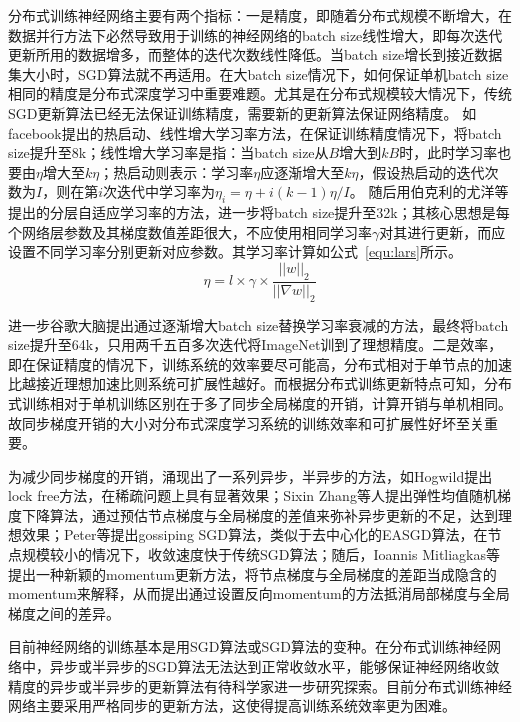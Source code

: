 分布式训练神经网络主要有两个指标：一是精度，即随着分布式规模不断增大，在数据并行方法下必然导致用于训练的神经网络的batch size线性增大，即每次迭代更新所用的数据增多，而整体的迭代次数线性降低。当batch size增长到接近数据集大小时，SGD算法就不再适用。在大batch size情况下，如何保证单机batch size相同的精度是分布式深度学习中重要难题。尤其是在分布式规模较大情况下，传统SGD更新算法已经无法保证训练精度，需要新的更新算法保证网络精度。
如facebook提出的热启动、线性增大学习率方法，在保证训练精度情况下，将batch size提升至8k；线性增大学习率是指：当batch size从$B$增大到$kB$时，此时学习率也要由$\eta$增大至$k\eta$；热启动则表示：学习率$\eta$应逐渐增大至$k\eta$，假设热启动的迭代次数为$I$，则在第$i$次迭代中学习率为$\eta _{i}=\eta + i(k-1)\eta/I$。
随后用伯克利的尤洋等提出的分层自适应学习率的方法，进一步将batch size提升至32k；其核心思想是每个网络层参数及其梯度数值差距很大，不应使用相同学习率$\gamma$对其进行更新，而应设置不同学习率分别更新对应参数。其学习率计算如公式~\ref{equ:lars}所示。
\begin{equation}
\eta = l \times \gamma \times \frac{||w||_{2}}{||\nabla w||_{2}}
\label{equ:lars}
\end{equation}

进一步谷歌大脑提出通过逐渐增大batch size替换学习率衰减的方法，最终将batch size提升至64k，只用两千五百多次迭代将ImageNet训到了理想精度。二是效率，即在保证精度的情况下，训练系统的效率要尽可能高，分布式相对于单节点的加速比越接近理想加速比则系统可扩展性越好。而根据分布式训练更新特点可知，分布式训练相对于单机训练区别在于多了同步全局梯度的开销，计算开销与单机相同。故同步梯度开销的大小对分布式深度学习系统的训练效率和可扩展性好坏至关重要。

为减少同步梯度的开销，涌现出了一系列异步，半异步的方法，如Hogwild提出lock free方法，在稀疏问题上具有显著效果；Sixin Zhang等人提出弹性均值随机梯度下降算法，通过预估节点梯度与全局梯度的差值来弥补异步更新的不足，达到理想效果；Peter等提出gossiping SGD算法，类似于去中心化的EASGD算法，在节点规模较小的情况下，收敛速度快于传统SGD算法；随后，Ioannis Mitliagkas等提出一种新颖的momentum更新方法，将节点梯度与全局梯度的差距当成隐含的momentum来解释，从而提出通过设置反向momentum的方法抵消局部梯度与全局梯度之间的差异。

目前神经网络的训练基本是用SGD算法或SGD算法的变种。在分布式训练神经网络中，异步或半异步的SGD算法无法达到正常收敛水平，能够保证神经网络收敛精度的异步或半异步的更新算法有待科学家进一步研究探索。目前分布式训练神经网络主要采用严格同步的更新方法，这使得提高训练系统效率更为困难。
